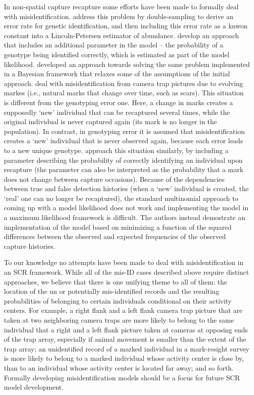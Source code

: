 In non-spatial capture recapture some efforts have been made to
formally deal with misidentification. \citet{stevick_etal:2001}
address this problem by double-sampling to derive an error rate for
genetic identification, and then including this error rate as a knwon
constant into a Lincoln-Petersen estimator of
abundance. \citet{lukacs_burnham:2005} develop an approach that
includes an additional parameter in the model -- the probability of a
genotype being identified correctly, which is estimated as part of the
model likelihood. \citet{link_etal:2010} developed an approach towards
solving the same problem implemented in a Bayesian framework that
relaxes some of the assumptions of the initial approach.
\citet{yoshizaki_etal:2009} deal with misidentification from camera
trap pictures due to evolving markes (i.e., natural marks that change
over time, such as scars). This situation is different from the
genotyping error one. Here, a change in marks creates a supposedly
`new' individual that can be recaptured several times, while the
original individual is never captured again (its mark is no longer in
the population). In contrast, in genotyping error it is assumed that
misidentification creates a `new' individual that is never observed
again, because each error leads to a new unique
genotype. \citet{yoshizaki_etal:2009} approach this situation
similarly, by including a parameter describing the probability of
correctly identifying an individual upon recapture (the parameter can
also be interpreted as the probability that a mark does not change
between capture occasions). Because of the dependencies between true
and false detection histories (when a `new' individual is created, the
`real' one can no longer be recaptured), the standard multinomial
approach to coming up with a model likelihood does not work and
implementing the model in a maximum likelihood framework is
difficult. The authors instead demostrate an implementation of the
model based on minimizing a function of the squared differences
between the observed and expected frequencies of the observed capture
histories.

To our knowledge no attempts have been made to deal with
misidentification in an SCR framework. While all of the mis-ID cases
described above require distinct approaches, we believe that there is
one unifying theme to all of them: the location of the un or
potentially mis-identified records and the resulting probabilities of
belonging to certain individuals conditional on their activity
centers. For example, a right flank and a left flank camera trap
picture that are taken at two neighboring camera traps are more likely
to belong to the same individual that a right and a left flank picture
taken at cameras at opposing ends of the trap array, especially if
animal movement is smaller than the extent of the trap array; an
unidentified record of a marked individual in a mark-resight survey is
more likely to belong to a marked individual whose activity center is
close by, than to an individual whose activity center is located far
away; and so forth. Formally developing misidentification models
should be a focus for future SCR model development.

